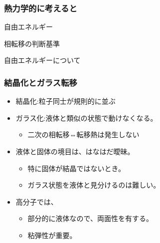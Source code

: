\documentclass[12pt, dvipdfmx]{beamer}
\begin{document}
\begin{frame}
    \frametitle{熱力学的に考えると}
    自由エネルギー
    
    相転移の判断基準

    自由エネルギーについて

\end{frame}

\begin{frame}
    \frametitle{結晶化とガラス転移}
        \begin{itemize}
            \item 結晶化:粒子同士が規則的に並ぶ
            \item ガラス化:液体と類似の状態で動けなくなる。
                \begin{itemize}
                    \item 二次の相転移⇔転移熱は発生しない
                \end{itemize}
        \end{itemize}


        \begin{itemize}
            \item 液体と固体の境目は、はなはだ曖昧。
                \begin{itemize}
                    \item 特に固体が結晶ではないとき。
                    \item ガラス状態を液体と見分けるのは難しい。
                \end{itemize}
            \item 高分子では、
                \begin{itemize}
                    \item 部分的に液体なので、両面性を有する。
                    \item 粘弾性が重要。
                \end{itemize}
        \end{itemize}
\end{frame}
\end{document}
